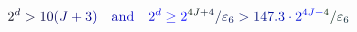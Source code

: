 \documentclass[12pt]{article}
\begin{document}
\makeatletter
\renewcommand*{\@textcolor}[3]{%
  \protect\leavevmode
  \begingroup
    \color#1{#2}#3%
  \endgroup
}
\makeatother
\begin{displaymath}
\mathcolor[RGB]{0,0,15}{2} ^ { \mathcolor[RGB]{0,0,30}{d} } \mathcolor[RGB]{0,0,45}{>} \mathcolor[RGB]{0,0,60}{1} \mathcolor[RGB]{0,0,75}{0} \mathcolor[RGB]{0,0,90}{(} \mathcolor[RGB]{0,0,105}{J} \mathcolor[RGB]{0,0,120}{+} \mathcolor[RGB]{0,0,135}{3} \mathcolor[RGB]{0,0,150}{)} \quad \mathrm { \mathcolor[RGB]{0,0,165}{a} \mathcolor[RGB]{0,0,180}{n} \mathcolor[RGB]{0,0,195}{d} } \quad \mathcolor[RGB]{0,0,210}{2} ^ { \mathcolor[RGB]{0,0,225}{d} } \mathcolor[RGB]{0,0,240}{\geq} \mathcolor[RGB]{0,0,255}{2} ^ { \mathcolor[RGB]{0,15,0}{4} \mathcolor[RGB]{0,15,15}{J} \mathcolor[RGB]{0,15,30}{+} \mathcolor[RGB]{0,15,45}{4} } \mathcolor[RGB]{0,15,60}{/} \mathcolor[RGB]{0,15,75}{\varepsilon} _ { \mathcolor[RGB]{0,15,90}{6} } \mathcolor[RGB]{0,15,105}{>} \mathcolor[RGB]{0,15,120}{1} \mathcolor[RGB]{0,15,135}{4} \mathcolor[RGB]{0,15,150}{7} \mathcolor[RGB]{0,15,165}{.} \mathcolor[RGB]{0,15,180}{3} \mathcolor[RGB]{0,15,195}{\cdot} \mathcolor[RGB]{0,15,210}{2} ^ { \mathcolor[RGB]{0,15,225}{4} \mathcolor[RGB]{0,15,240}{J} \mathcolor[RGB]{0,15,255}{-} \mathcolor[RGB]{0,30,0}{4} } \mathcolor[RGB]{0,30,15}{/} \mathcolor[RGB]{0,30,30}{\varepsilon} _ { \mathcolor[RGB]{0,30,45}{6} }
\end{displaymath}
\end{document}
